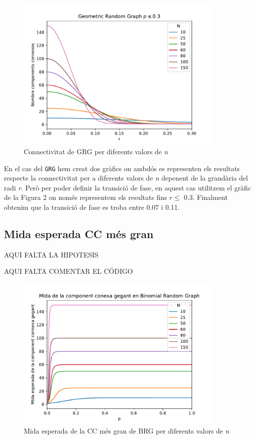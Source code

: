 \begin{figure}[H]
    \centering
    \includegraphics[width=10cm]{plots/geo_mult_2_03.pdf}
    \caption{Connectivitat de GRG per diferents valors de \textit{n}}
    \label{fig:connect_04}
\end{figure}

En el cas del \texttt{GRG} hem creat dos gràfics on ambdós es representen els resultats respecte la connectivitat per a diferents valors de \textit{n} depenent de la grandària del radi \textit{r}. Però per poder definir la transició de fase, en aquest cas utilitzem el gràfic de la Figura 2 on només representem els resultats fins $r\leq$ 0.3. Finalment obtenim que la transició de fase es troba entre 0.07 i 0.11.


\subsection{Mida esperada CC més gran}
AQUI FALTA LA HIPOTESIS

AQUI FALTA COMENTAR EL CÓDIGO

\begin{figure}[H]
    \centering
    \includegraphics[width=10cm]{plots/BRG_midaCompConMax.pdf}
    \caption{Mida esperada de la CC més gran de BRG per diferents valors de \textit{n}}
    \label{fig:connect_04}
\end{figure}

